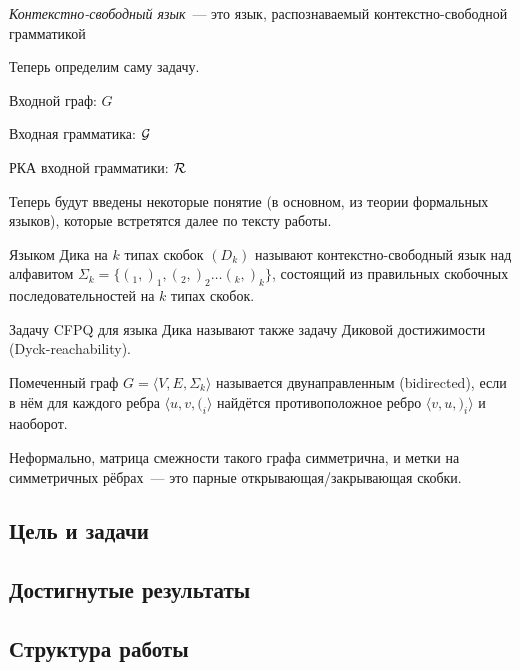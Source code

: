 \begin{definition}
\textit{Контекстно-свободный язык}~--- это язык, распознаваемый контекстно-свободной грамматикой

\end{definition}

Теперь определим саму задачу.

\begin{definition}
    Входной граф: $G$

    Входная грамматика: $\mathcal{G}$

    РКА входной грамматики: $\mathcal{R}$


\end{definition}

Теперь будут введены некоторые понятие (в основном, из теории формальных языков), которые встретятся далее по тексту работы.

\begin{definition}
    Языком Дика на $k$ типах скобок $(D_k)$ называют контекстно-свободный язык над алфавитом $\Sigma_k = \{ (_1, )_1, (_2, )_2 \dots (_k, )_k \}$, состоящий из правильных скобочных последовательностей на $k$ типах скобок.

    Задачу CFPQ для языка Дика называют также задачу Диковой достижимости (Dyck-reachability).
\end{definition}

\begin{definition}
    Помеченный граф $G = \langle V, E, \Sigma_k \rangle$ называется двунаправленным (bidirected), если в нём для каждого ребра $\langle u, v, (_i \rangle$ найдётся противоположное ребро $\langle v, u, )_i \rangle$ и наоборот.

    Неформально, матрица смежности такого графа симметрична, и метки на симметричных рёбрах~--- это парные открывающая/закрывающая скобки.
\end{definition}

\begin{definition}

\end{definition}

\subsection*{Цель и задачи}

\subsection*{Достигнутые результаты}

\subsection*{Структура работы}